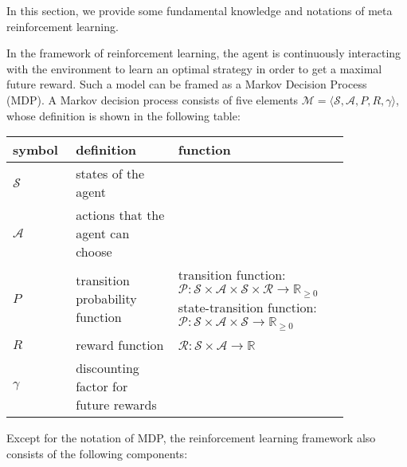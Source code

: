 In this section, we provide some fundamental knowledge and notations of meta reinforcement learning.

\par
In the framework of reinforcement learning, the agent is continuously interacting with the environment to learn an optimal strategy in order to get a maximal future reward. Such a model can be framed as a Markov Decision Process (MDP). A Markov decision process consists of five elements $\mathcal{M} = \langle \mathcal{S}, \mathcal{A}, P, R, \gamma \rangle$, whose definition is shown in the following table:

\begin{center}
	\begin{tabular}{| p{0.12\linewidth} | p{0.27\linewidth} | p{0.45\linewidth} |}
		\hline
		\textbf{symbol} & \textbf{definition} & \textbf{function} \\
		\hline
		$\mathcal{S}$ & states of the agent &  \\ 
		\hline
		$\mathcal{A}$ & actions that the agent can choose &  \\ 
		\hline 
		$P$ & transition probability function & transition function:\newline $\mathcal{P}: \mathcal{S} \times \mathcal{A} \times \mathcal{S} \times \mathcal{R} \rightarrow \mathbb{R}_{\geq 0}$\newline state-transition function:\newline $\mathcal{P}: \mathcal{S} \times \mathcal{A} \times \mathcal{S} \rightarrow \mathbb{R}_{\geq 0}$\\
		\hline 
		$R$ & reward function & $\mathcal{R}: \mathcal{S} \times \mathcal{A} \rightarrow \mathbb{R}$ \\
		\hline 
		$\gamma$ & discounting factor for future rewards &  \\
		\hline 
	\end{tabular}
\end{center}

\par
Except for the notation of MDP, the reinforcement learning framework also consists of the following components:

